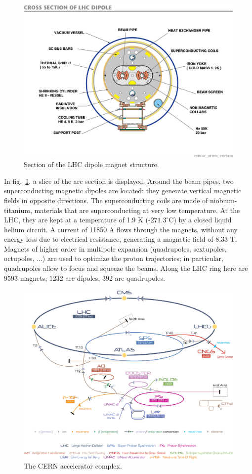 \begin{figure}[!htb]
  \centering
    \includegraphics[width=.6\textwidth]{figures/LHC-magnets.jpg}
  \caption{Section of the LHC dipole magnet structure.}
  \label{fig:LHC_dipole}
\end{figure}

\noindent In fig.~\ref{fig:LHC_dipole}, a slice of the arc section is displayed. Around the beam pipes, two superconducting magnetic dipoles are located: they generate vertical magnetic fields in opposite directions. The superconducting coils are made of niobium-titanium, materials that are superconducting at very low temperature. At the LHC, they are kept at a temperature of 1.9 K (-$271.3^{\circ}$C) by a closed liquid helium circuit. A current of 11850 A flows through the magnets, without any energy loss due to electrical resistance, generating a magnetic field of 8.33 T. Magnets of higher order in multipole expansion (quadrupoles, sextupoles, octupoles, ...) are used to optimize the proton trajectories; in particular, quadrupoles allow to focus and squeeze the beams. Along the LHC ring here are 9593 magnets; 1232 are dipoles, 392 are quadrupoles.

\begin{figure}[!htb]
  \centering
    \includegraphics[width=.75\textwidth]{figures/Cern-Accelerator-Complex.jpg}
  \caption{The CERN accelerator complex.}
  \label{fig:LHC_accelerator_complex}
\end{figure}

